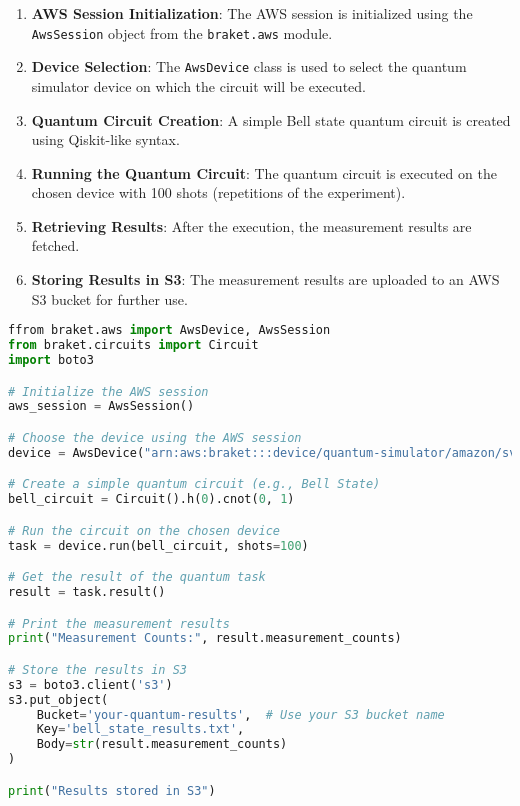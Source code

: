 \documentclass[conference]{IEEEtran}
\begin{document}
\begin{enumerate}
    \item \textbf{AWS Session Initialization}: The AWS session is initialized using the \texttt{AwsSession} object from the \texttt{braket.aws} module.
    \item \textbf{Device Selection}: The \texttt{AwsDevice} class is used to select the quantum simulator device on which the circuit will be executed.
    \item \textbf{Quantum Circuit Creation}: A simple Bell state quantum circuit is created using Qiskit-like syntax.
    \item \textbf{Running the Quantum Circuit}: The quantum circuit is executed on the chosen device with 100 shots (repetitions of the experiment).
    \item \textbf{Retrieving Results}: After the execution, the measurement results are fetched.
    \item \textbf{Storing Results in S3}: The measurement results are uploaded to an AWS S3 bucket for further use.
\end{enumerate}

\begin{tcolorbox}[title=src/aws\_braket.py, colback=gray!5!white, colframe=blue!75!black]
\begin{lstlisting}[language=Python]
ffrom braket.aws import AwsDevice, AwsSession
from braket.circuits import Circuit
import boto3

# Initialize the AWS session
aws_session = AwsSession()

# Choose the device using the AWS session
device = AwsDevice("arn:aws:braket:::device/quantum-simulator/amazon/sv1")

# Create a simple quantum circuit (e.g., Bell State)
bell_circuit = Circuit().h(0).cnot(0, 1)

# Run the circuit on the chosen device
task = device.run(bell_circuit, shots=100)

# Get the result of the quantum task
result = task.result()

# Print the measurement results
print("Measurement Counts:", result.measurement_counts)

# Store the results in S3
s3 = boto3.client('s3')
s3.put_object(
    Bucket='your-quantum-results',  # Use your S3 bucket name
    Key='bell_state_results.txt',
    Body=str(result.measurement_counts)
)

print("Results stored in S3")

\end{lstlisting}
\end{tcolorbox}
\end{document}
